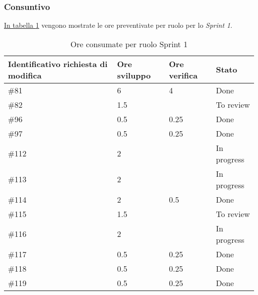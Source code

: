 \subsubsection{Consuntivo}

\hyperref[tab:sprint1_ore_consumate]{In tabella \ref{tab:sprint1_ore_consumate}} vengono mostrate le ore preventivate per ruolo per lo \textit{Sprint 1}.

\begin{table}[H]
    \centering
        \begin{tabular}{| l | l | l | l |}
            \hline
                \textbf{Identificativo richiesta di modifica} & 
                \textbf{Ore sviluppo} &
                \textbf{Ore verifica} & 
                \textbf{Stato}\\ 
    \hline
        \#81 & 6 & 4 & Done\\
    \hline
        \#82 & 1.5 &  & To review\\
    \hline
        \#96 & 0.5 & 0.25 & Done\\
    \hline
        \#97 & 0.5 & 0.25 & Done\\
    \hline
        \#112 & 2 & & In progress\\
    \hline
        \#113 & 2 & & In progress\\
    \hline
        \#114 & 2 & 0.5 & Done\\
    \hline
        \#115 & 1.5 & & To review\\
    \hline
        \#116 & 2 & & In progress\\
    \hline
        \#117 & 0.5 & 0.25 & Done\\
    \hline
        \#118 & 0.5 & 0.25 & Done\\
    \hline
        \#119 & 0.5 & 0.25 & Done\\
    \hline
    \end{tabular}
    \caption{Ore consumate per ruolo Sprint 1}
    \label{tab:sprint1_ore_consumate} 
\end{table}